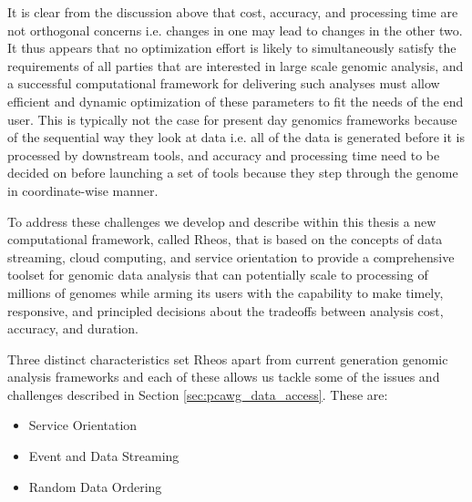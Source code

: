 It is clear from the discussion above that cost, accuracy, and processing time are not orthogonal concerns i.e. changes in one may lead to changes in the other two. It thus appears that no optimization effort is likely to simultaneously satisfy the requirements of all parties that are interested in large scale genomic analysis, and a successful computational framework for delivering such analyses must allow efficient and dynamic optimization of these parameters to fit the needs of the end user. This is typically not the case for present day genomics frameworks because of the sequential way they look at data\autocite{mckenna2010genome, van2013fastq} i.e. all of the data is generated before it is processed by downstream tools, and accuracy and processing time need to be decided on before launching a set of tools because they step through the genome in coordinate-wise manner.

To address these challenges we develop and describe within this thesis a new computational framework, called Rheos, that is based on the concepts of data streaming, cloud computing, and service orientation to provide a comprehensive toolset for genomic data analysis that can potentially scale to processing of millions of genomes while arming its users with the capability to make timely, responsive, and principled decisions about the tradeoffs between analysis cost, accuracy, and duration.

Three distinct characteristics set Rheos apart from current generation genomic analysis frameworks and each of these allows us tackle some of the issues and challenges described in Section \ref{sec:pcawg_data_access}. These are:

\begin{itemize}
\item Service Orientation
\item Event and Data Streaming
\item Random Data Ordering
\end{itemize}

